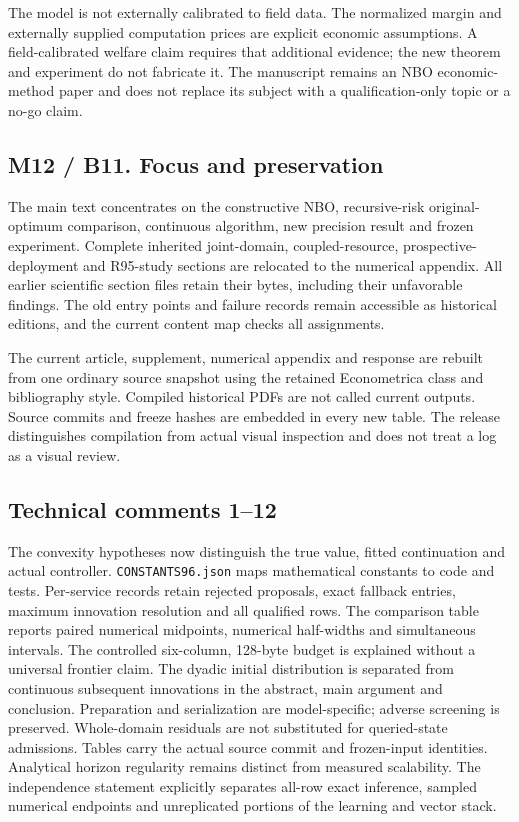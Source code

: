The model is not externally calibrated to field data. The normalized
margin and externally supplied computation prices are explicit economic
assumptions. A field-calibrated welfare claim requires that additional
evidence; the new theorem and experiment do not fabricate it. The
manuscript remains an NBO economic-method paper and does not replace its
subject with a qualification-only topic or a no-go claim.

\hypertarget{m12-b11.-focus-and-preservation}{%
\subsection{M12 / B11. Focus and
preservation}\label{m12-b11.-focus-and-preservation}}

The main text concentrates on the constructive NBO, recursive-risk
original-optimum comparison, continuous algorithm, new precision result
and frozen experiment. Complete inherited joint-domain,
coupled-resource, prospective-deployment and R95-study sections are
relocated to the numerical appendix. All earlier scientific section
files retain their bytes, including their unfavorable findings. The old
entry points and failure records remain accessible as historical
editions, and the current content map checks all assignments.

The current article, supplement, numerical appendix and response are
rebuilt from one ordinary source snapshot using the retained
Econometrica class and bibliography style. Compiled historical PDFs are
not called current outputs. Source commits and freeze hashes are
embedded in every new table. The release distinguishes compilation from
actual visual inspection and does not treat a log as a visual review.

\hypertarget{technical-comments-112}{%
\subsection{Technical comments 1--12}\label{technical-comments-112}}

The convexity hypotheses now distinguish the true value, fitted
continuation and actual controller. \texttt{CONSTANTS96.json} maps
mathematical constants to code and tests. Per-service records retain
rejected proposals, exact fallback entries, maximum innovation
resolution and all qualified rows. The comparison table reports paired
numerical midpoints, numerical half-widths and simultaneous intervals.
The controlled six-column, 128-byte budget is explained without a
universal frontier claim. The dyadic initial distribution is separated
from continuous subsequent innovations in the abstract, main argument
and conclusion. Preparation and serialization are model-specific;
adverse screening is preserved. Whole-domain residuals are not
substituted for queried-state admissions. Tables carry the actual source
commit and frozen-input identities. Analytical horizon regularity
remains distinct from measured scalability. The independence statement
explicitly separates all-row exact inference, sampled numerical
endpoints and unreplicated portions of the learning and vector stack.

